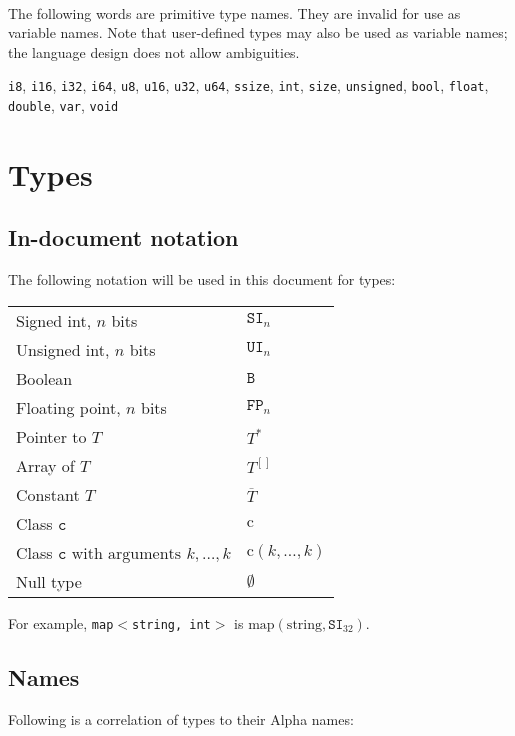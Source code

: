 \documentclass{article}
\newcommand{\R}[1]{\mathtt{#1}}
\newcommand{\K}[1]{\mathrm{#1}}
\begin{document}
\ \\

The following words are primitive type names. They are invalid for use as
variable names. Note that user-defined types may also be used as variable names;
the language design does not allow ambiguities.

\texttt{i8},
\texttt{i16},
\texttt{i32},
\texttt{i64},
\texttt{u8},
\texttt{u16},
\texttt{u32},
\texttt{u64},
\texttt{ssize},
\texttt{int},
\texttt{size},
\texttt{unsigned},
\texttt{bool},
\texttt{float},
\texttt{double},
\texttt{var},
\texttt{void}

\section{Types}
\label{sec:types}

\subsection{In-document notation}
\label{sub:types:indoc}
The following notation will be used in this document for types:

\begin{tabular}{|l|l|}
\hline
Signed int, $n$ bits & $\R{SI}_n$ \\
Unsigned int, $n$ bits & $\R{UI}_n$ \\
Boolean & $\R{B}$ \\
Floating point, $n$ bits & $\R{FP}_n$ \\
Pointer to $T$ & $T^*$ \\
Array of $T$ & $T^{[]}$ \\
Constant $T$ & $\overline{T}$ \\
Class $\R{c}$ & $\K{c}$ \\
Class $\R{c} \textrm{ with arguments } k, \ldots, k$ & $\K{c}(k, \ldots, k)$ \\
Null type & $\emptyset$ \\
\hline
\end{tabular}

For example, \texttt{map$<$string, int$>$} is
$\K{map}(\K{string}, \R{SI}_{32})$.

\subsection{Names}
\label{sub:types:names}
Following is a correlation of types to their Alpha names:
\end{document}
